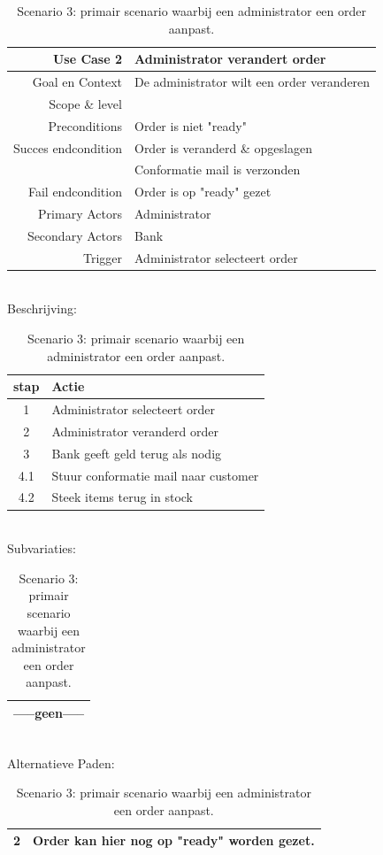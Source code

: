 \documentclass[•]{article}
\begin{document}
 \begin{table}
\centering
\begin{tabular}{|rl|}
\hline
Use Case 2 & Administrator verandert order \\
\hline
Goal en Context 		& De administrator wilt een order veranderen\\
Scope \& level 			& \\
Preconditions			& Order is niet "ready"\\
Succes endcondition 	& Order is veranderd \& opgeslagen\\
						& Conformatie mail is verzonden\\
Fail endcondition		& Order is op "ready" gezet\\
Primary Actors			& Administrator\\
Secondary Actors		& Bank\\
Trigger					& Administrator selecteert order\\
\hline
\end{tabular}
\\
Beschrijving:
\\
\begin{tabular}{|cl|}
\hline
stap	& Actie\\
\hline
1	& Administrator selecteert order\\
2	& Administrator veranderd order\\
3	& Bank geeft geld terug als nodig\\
4.1	& Stuur conformatie mail naar customer\\
4.2 & Steek items terug in stock\\
\hline
\end{tabular}
\\
Subvariaties:
\\
\begin{tabular}{|c|}
\hline
-----geen-----\\
\hline
\end{tabular}
\\
Alternatieve Paden:
\\
\begin{tabular}{|cl|}
\hline
2	&	Order kan hier nog op "ready" worden gezet.\\
\hline
\end{tabular}
\caption{Scenario 3: primair scenario waarbij een administrator een order aanpast.}
\label{Prim_scenario_3}
\end{table}
\end{document}

